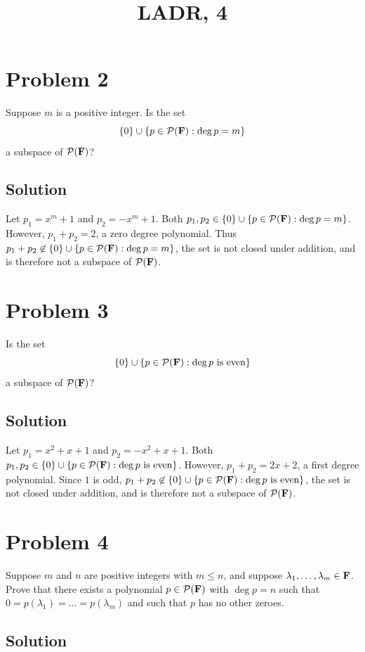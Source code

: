 \documentclass{article}
\title{LADR, 4}
\begin{document}
\maketitle

\section*{Problem 2}
Suppose $m$ is a positive integer. Is the set
\[\{0\}\cup\{p\in\mathcal{P}(\mathbf{F}):\deg p=m\}\]
a subspace of $\mathcal{P}(\mathbf{F})$?

\subsection*{Solution}

Let $p_1=x^m + 1$ and $p_2=-x^m + 1$. Both $p_1,p_2\in\{0\}\cup\{p\in\mathcal{P}(\mathbf{F}):\deg p=m\}$. However, $p_1+p_2=2$, a zero degree polynomial. Thus $p_1+p_2\not\in\{0\}\cup\{p\in\mathcal{P}(\mathbf{F}):\deg p=m\}$, the set is not closed under addition, and is therefore not a subspace of $\mathcal{P}(\mathbf{F})$.

\section*{Problem 3}
Is the set
\[\{0\}\cup\{p\in\mathcal{P}(\mathbf{F}):\deg p\text{ is even}\}\]
a subspace of $\mathcal{P}(\mathbf{F})$?

\subsection*{Solution}

Let $p_1=x^2 + x + 1$ and $p_2=-x^2 + x + 1$. Both $p_1,p_2\in\{0\}\cup\{p\in\mathcal{P}(\mathbf{F}):\deg p\text{ is even}\}$. However, $p_1+p_2=2x+2$, a first degree polynomial. Since $1$ is odd, $p_1+p_2\not\in\{0\}\cup\{p\in\mathcal{P}(\mathbf{F}):\deg p\text{ is even}\}$, the set is not closed under addition, and is therefore not a subspace of $\mathcal{P}(\mathbf{F})$.

\newpage
\section*{Problem 4}
Suppose $m$ and $n$ are positive integers with $m\leq n$, and suppose $\lambda_1,\ldots,\lambda_m\in\mathbf{F}$. Prove that there exists a polynomial $p\in\mathcal{P}(\mathbf{F})$ with $\deg p = n$ such that $0=p(\lambda_1)=\ldots=p(\lambda_m)$ and such that $p$ has no other zeroes.

\subsection*{Solution}
\end{document}
